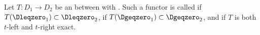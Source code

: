 \begin{definition} \label{definition:t_left_exact_right_exact_functors_between_triangulated_categories_with_t_structures}
    Let $T: D_1 \to D_2$ be an  between  with . 
    Such a functor is called  if $T(\Dleqzero_1) \subset \Dleqzero_2$,  if $T(\Dgeqzero_1) \subset \Dgeqzero_2$, and  if $T$ is both $t$-left and $t$-right exact.
\end{definition}